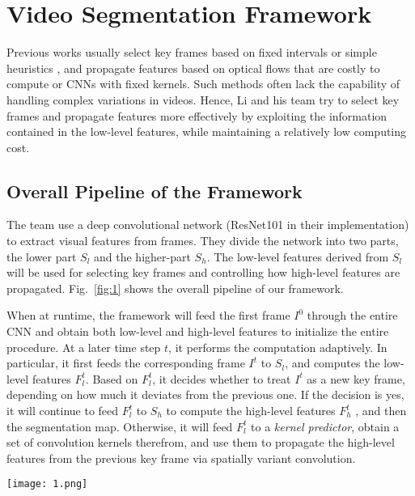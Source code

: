 \documentclass[10pt,twocolumn,letterpaper]{article}
\begin{document}
\section{Video Segmentation Framework}

Previous works usually select key frames based on fixed intervals \cite{Zhu2017Deep} or simple heuristics \cite{shelhamer2016clockwork}, and propagate features based on optical flows that are costly to compute or CNNs with fixed kernels. Such methods often lack the capability of handling complex variations in videos. Hence, Li and his team try to select key frames and propagate features more effectively by exploiting the information contained in the low-level features, while maintaining a relatively low computing cost. 

\subsection{Overall Pipeline of the Framework}

The team use a deep convolutional network (ResNet101 \cite{he2016deep} in their implementation) to extract visual features from frames. They divide the network into two parts, the lower part $S_l$ and the higher-part $S_h$. The low-level features derived from $S_l$ will be used for selecting key frames and controlling how high-level features are propagated. Fig.~\ref{fig:1} shows the overall pipeline of our framework.

When at runtime, the framework will feed the first frame $I^0$ through the entire CNN and obtain both low-level and high-level features to initialize the entire procedure. At a later time step $t$, it performs the computation adaptively. In particular, it first feeds the corresponding frame $I^t$ to $S_l$, and computes the low-level features $F_l^t$. Based on $F_l^t$, it decides whether to treat $I^t$ as a new key frame, depending on how much it deviates from the previous one. If the decision is yes, it will continue to feed $F_l^t$ to $S_h$ to compute the high-level features $F_h^t$ , and then the segmentation map. Otherwise, it will feed $F_l^t$ to a \emph{kernel predictor}, obtain a set of convolution kernels therefrom, and use them to propagate the high-level features from the previous key frame via spatially variant convolution.

\begin{figure*}
	\begin{center}
		\texttt{[image: 1.png]}
	\end{center}
	\caption{The overall pipeline. At each time step $t$, the lower-part of the CNN $S_l$ first computes the low-level features $F_l^t$. Based on both $F_l^k$ (the low-level features of the previous key frame) and $F_l^t$, the framework will decide whether to set $I^t$ as a new key frame. If yes, the high-level features $F_h^t$ will be computed based on the expensive higher-part $S_h$; otherwise, they will be derived by propagating from $F_h^k$ using spatially variant convolution. The high-level features, obtained in either way, will be used in predicting semantic labels.}
	\label{fig:1}
\end{figure*}
\end{document}
